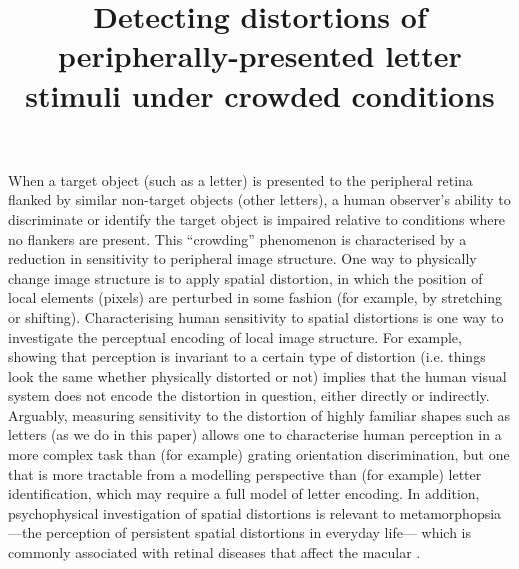 \documentclass[doc, 11pt,a4paper,natbib]{apa6}\usepackage[]{graphicx}\usepackage[]{color}
\title{
Detecting distortions of peripherally-presented letter stimuli under crowded conditions
}
\begin{document}
\linenumbers

\maketitle



When a target object (such as a letter) is presented to the peripheral retina flanked by similar non-target objects (other letters), a human observer's ability to discriminate or identify the target object is impaired relative to conditions where no flankers are present.
This ``crowding'' phenomenon
\citep{andriessen_eccentric_1975,levi_vernier_1985,greenwood_positional_2009,
bouma_interaction_1970,parkes_compulsory_2001,toet_twodimensional_1992,strasburger_dancing_2014,
herzog_crowding_2015,harrison_unifying_2015}
is characterised by a reduction in sensitivity to peripheral image structure.
One way to physically change image structure is to apply spatial distortion, in which the position of local elements (pixels) are perturbed in some fashion (for example, by stretching or shifting).
Characterising human sensitivity to spatial distortions is one way to investigate the perceptual encoding of local image structure.
For example, showing that perception is invariant to a certain type of distortion (i.e. things look the same whether physically distorted or not) implies that the human visual system does not encode the distortion in question, either directly or indirectly.
Arguably, measuring sensitivity to the distortion of highly familiar shapes such as letters (as we do in this paper) allows one to characterise human perception in a more complex task than (for example) grating orientation discrimination, but one that is more tractable from a modelling perspective than (for example) letter identification, which may require a full model of letter encoding.
In addition, psychophysical investigation of spatial distortions is relevant to metamorphopsia---the perception of persistent spatial distortions in everyday life--- which is commonly associated with retinal diseases that affect the macular \citep{wiecek_metamorphopsia_2014}.
\end{document}
